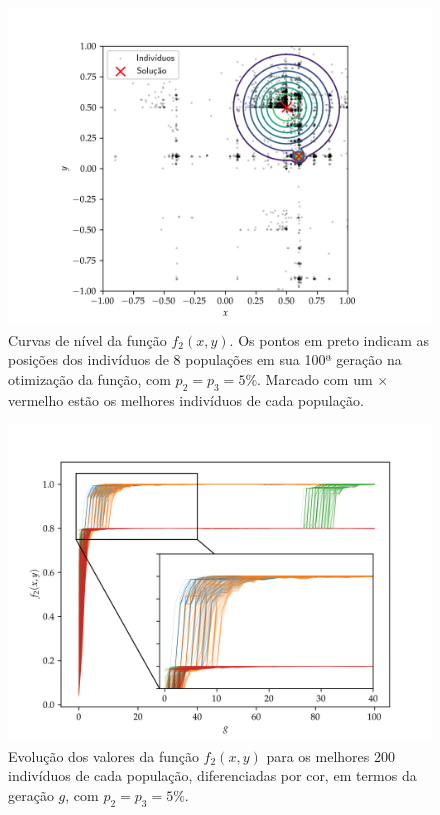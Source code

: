 \begin{figure}[p]
  \centering
  \includegraphics[width=\textwidth]{imagens/low_prob/contour_near_gaussians.png}
  \caption{
    Curvas de nível da função $f_2(x,y)$. Os pontos em preto indicam as posições dos indivíduos
    de 8 populações em sua 100ª geração na otimização da função, com $ p_2 = p_3 = 5\% $. 
    Marcado com um $\times$ vermelho estão os melhores indivíduos de cada população.
  }
  \label{fig:contour_near_gaussians}
\end{figure}

\begin{figure}[p]
  \centering
  \includegraphics[width=\textwidth]{imagens/low_prob/evolution_near_gaussians.png}
  \caption{
    Evolução dos valores da função $ f_2(x,y) $ para os
    melhores 200 indivíduos de cada população, diferenciadas por cor, em termos da geração $g$,
    com $ p_2 = p_3 = 5\% $.
  }
  \label{fig:evolution_near_gaussians}
\end{figure}

